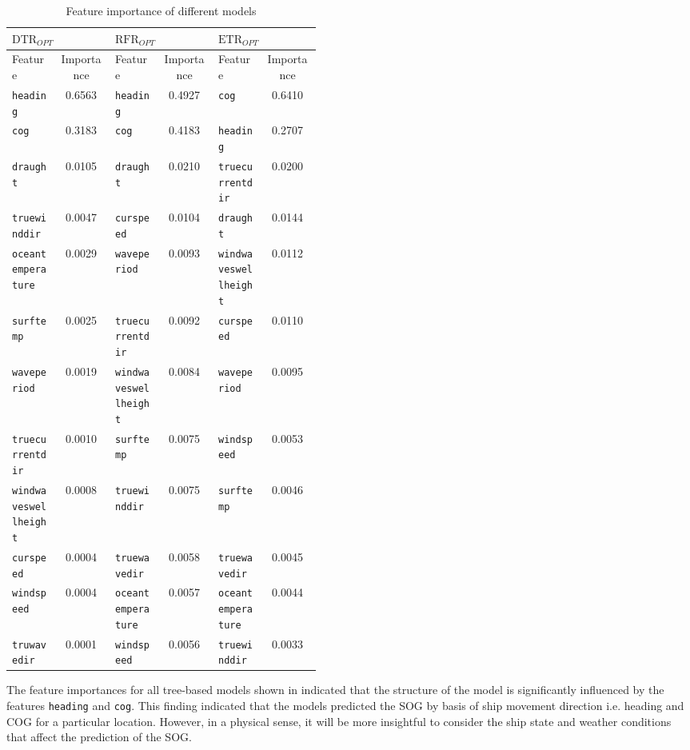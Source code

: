 \begin{table}[ht]
    \scriptsize
    \centering
    \resizebox {\textwidth}{!}
    {\begin{tabular}{ p{0.15\linewidth} c| p{0.15\linewidth} c| p{0.15\linewidth} c}
    \hline
    $\text{DTR}_{OPT}$ & & $\text{RFR}_{OPT}$ & & $\text{ETR}_{OPT}$\\
    \hline
    Feature & Importance & Feature & Importance & Feature & Importance\\
    \hline
    {\tt heading} & 0.6563 & {\tt heading} & 0.4927 & {\tt cog} & 0.6410 \\
    {\tt cog} & 0.3183 & {\tt cog} & 0.4183 & {\tt heading} & 0.2707 \\
    {\tt draught} & 0.0105 & {\tt draught} & 0.0210 & {\tt truecurrentdir} & 0.0200\\
    {\tt truewinddir} & 0.0047 & {\tt curspeed} & 0.0104 & {\tt draught} & 0.0144 \\
    {\tt oceantemperature} & 0.0029 & {\tt waveperiod} & 0.0093& {\tt windwaveswellheight} & 0.0112\\
    {\tt surftemp} & 0.0025&{\tt truecurrentdir} & 0.0092 & {\tt curspeed} & 0.0110\\
    {\tt waveperiod} & 0.0019 & {\tt windwaveswellheight} & 0.0084& {\tt waveperiod} & 0.0095 \\
    {\tt truecurrentdir} & 0.0010 & {\tt surftemp} & 0.0075& {\tt windspeed} & 0.0053\\
    {\tt windwaveswellheight} & 0.0008 & {\tt truewinddir} & 0.0075& {\tt surftemp} & 0.0046 \\
    {\tt curspeed} & 0.0004 & {\tt truewavedir} & 0.0058& {\tt truewavedir} & 0.0045 \\
    {\tt windspeed} & 0.0004 & {\tt oceantemperature} & 0.0057& {\tt oceantemperature} & 0.0044\\
    {\tt truwavedir} & 0.0001 & {\tt windspeed} & 0.0056& {\tt truewinddir} & 0.0033\\
    \end{tabular}}
\caption{Feature importance of different models}\label{tbl:feature_importances}
\end{table}

The feature importances for all tree-based models shown in  indicated that the structure of the model is significantly influenced by the features {\tt heading} and {\tt cog}. This finding indicated that the models predicted the SOG by basis of ship movement direction i.e. heading and COG for a particular location. However, in a physical sense, it will be more insightful to consider the ship state and weather conditions that affect the prediction of the SOG.\\

